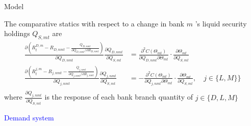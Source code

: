 \documentclass[notes,11pt, aspectratio=169]{beamer}
\begin{document}
\begin{frame}{Model}


    The comparative statics with respect to a change in bank $m$ 's liquid security holdings $Q_{S, m t}$ are
$$
\begin{aligned}
\frac{\partial\left(R_t^{D, m}-R_{D, n m t}-\frac{Q_{D, n m t}}{\partial Q_{D, n m t} / \partial R_{D, n m t}}\right)}{\partial Q_{D, n m t}} \frac{\partial Q_{D, n m t}}{\partial Q_{S, m t}} & =\frac{\partial^2 C\left(\Theta_{m t}\right)}{\partial Q_{D, n m t} \partial \Theta_{m t}} \cdot \frac{\partial \Theta_{m t}}{\partial Q_{S, m t}} \\
\frac{\partial\left(R_t^{j, m}-R_{j, n m t}-\frac{Q_{j, n m t}}{\partial Q_{j, n m t} / \partial R_{j, n m t}}\right)}{\partial Q_{j, n m t}} \frac{\partial Q_{j, n m t}}{\partial Q_{S, m t}} & =-\frac{\partial^2 C\left(\Theta_{m t}\right)}{\partial Q_{j, n m t} \partial \Theta_{m t}} \cdot \frac{\partial \Theta_{m t}}{\partial Q_{S, m t}}, \quad j \in \{ L,M\} \}  \\
\end{aligned}
$$
 where $\frac{\partial Q_{j, n m t}}{\partial Q_{S, m t}}$ is the response of each bank branch quantity of $j \in \{D,L,M \}$ %
\end{frame}


\begin{frame}
    \textcolor{blue}{\huge{\centerline{Demand system}}}
\end{frame}
\end{document}
